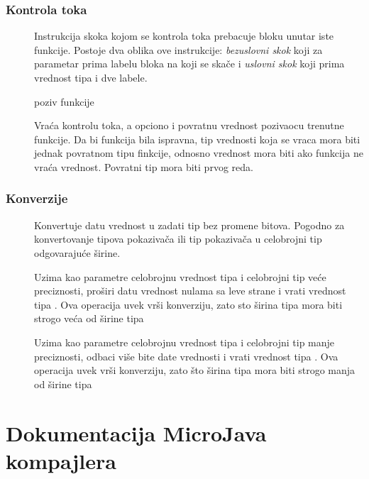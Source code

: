 \subsection*{Kontrola toka}

\begin{description}
\item[] Instrukcija skoka kojom se kontrola toka prebacuje bloku unutar iste funkcije. Postoje dva oblika ove instrukcije: \textit{bezuslovni skok} koji za parametar prima labelu bloka na koji se skače i \textit{uslovni skok} koji prima vrednost tipa  i dve labele.
\item[] poziv funkcije
\item[] Vraća kontrolu toka, a opciono i povratnu vrednost pozivaocu trenutne funkcije. Da bi funkcija bila ispravna, tip vrednosti koja se vraca mora biti jednak povratnom tipu finkcije, odnosno vrednost mora biti  ako funkcija ne vraća vrednost. Povratni tip mora biti prvog reda.
\end{description}

\subsection*{Konverzije}

\begin{description}
\item[] Konvertuje datu vrednost u zadati tip bez promene bitova. Pogodno za konvertovanje tipova pokazivača ili tip pokazivača u celobrojni tip odgovarajuće širine.
\item[]
\item[] Uzima kao parametre celobrojnu vrednost tipa  i celobrojni tip  veće preciznosti, proširi datu vrednost nulama sa leve strane i vrati vrednost tipa . Ova operacija uvek vrši konverziju, zato sto širina tipa  mora biti strogo veća od širine tipa 
\item[] Uzima kao parametre celobrojnu vrednost tipa  i celobrojni tip  manje preciznosti, odbaci više bite date vrednosti i vrati vrednost tipa . Ova operacija uvek vrši konverziju, zato što širina tipa  mora biti strogo manja od širine tipa 
\end{description}



\chapter{Dokumentacija MicroJava kompajlera}

